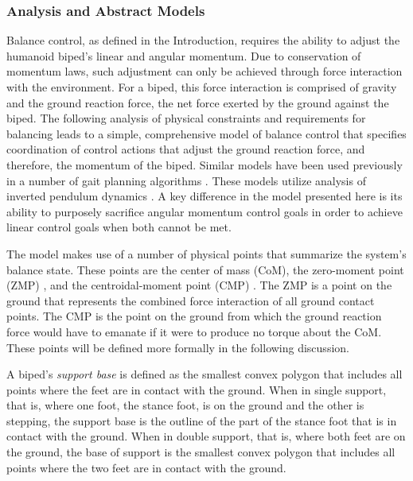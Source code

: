 \documentclass{llncs}
\begin{document}
\subsubsection{Analysis and Abstract Models}



Balance control, as defined in the Introduction, requires the ability to adjust the humanoid biped’s linear and angular momentum.  
Due to conservation of momentum laws, such adjustment can only be achieved through force interaction with the environment.  
For a biped, this force interaction is comprised of gravity and the ground reaction force, the net force exerted by the ground against the biped.  
The following analysis of physical constraints and requirements for balancing leads to a simple, comprehensive model of balance control that specifies 
coordination of control actions that adjust the ground reaction force, and therefore, the momentum of the biped.
Similar models have been used previously in a number of gait planning algorithms 
\cite{kajita2001real, yokoi2001honda, sugihara2002real, nishiwaki2002online}.
These models utilize analysis of inverted pendulum dynamics \cite{formal2006inverted}.
A key difference in the model presented here is its ability to 
purposely sacrifice angular momentum control goals in order to achieve linear control goals when both cannot be met.  

The model makes use of a number of physical points that summarize the system’s balance state.  
These points are the center of mass (CoM), the zero-moment point (ZMP) \cite{vukobratovic69},
and the centroidal-moment point (CMP) \cite{popovic2005ground}.  
The ZMP is a point on the ground that represents the combined force interaction of all ground contact points.  
The CMP is the point on the ground from which the ground reaction force would have to emanate if it were to produce no torque about the CoM. 
These points will be defined more formally in the following discussion.

A biped’s \textit{support base} is defined as the smallest convex polygon that includes all points where the feet are in contact with the ground.  
When in single support, that is, where one foot, the stance foot, is on the ground and the other is stepping, the support base is the outline of the part of 
the stance foot that is in contact with the ground.  
When in double support, that is, where both feet are on the ground, the base of support is the smallest convex polygon that includes all points where the two feet are in 
contact with the ground.  
\end{document}
